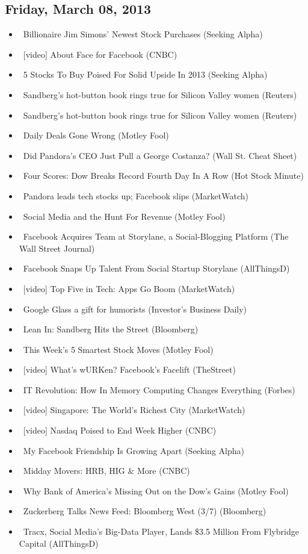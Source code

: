 \documentclass[11pt,asymmetric]{article}
\begin{document}
\subsection*{Friday, March 08, 2013}
\begin{itemize}
\item\ Billionaire Jim Simons' Newest Stock Purchases (Seeking Alpha)
\item\ [video] About Face for Facebook (CNBC)
\item\ 5 Stocks To Buy Poised For Solid Upside In 2013 (Seeking Alpha)
\item\ Sandberg's hot-button book rings true for Silicon Valley women (Reuters)
\item\ Sandberg's hot-button book rings true for Silicon Valley women (Reuters)
\item\ Daily Deals Gone Wrong (Motley Fool)
\item\ Did Pandora’s CEO Just Pull a George Costanza? (Wall St. Cheat Sheet)
\item\ Four Scores: Dow Breaks Record Fourth Day In A Row (Hot Stock Minute)
\item\ Pandora leads tech stocks up; Facebook slips (MarketWatch)
\item\ Social Media and the Hunt For Revenue (Motley Fool)
\item\ Facebook Acquires Team at Storylane, a Social-Blogging Platform (The Wall Street Journal)
\item\ Facebook Snaps Up Talent From Social Startup Storylane (AllThingsD)
\item\ [video] Top Five in Tech: Apps Go Boom (MarketWatch)
\item\ Google Glass a gift for humorists (Investor's Business Daily)
\item\ Lean In: Sandberg Hits the Street (Bloomberg)
\item\ This Week's 5 Smartest Stock Moves (Motley Fool)
\item\ [video] What's wURKen? Facebook's Facelift (TheStreet)
\item\ IT Revolution: How In Memory Computing Changes Everything (Forbes)
\item\ [video] Singapore: The World's Richest City (MarketWatch)
\item\ [video] Nasdaq Poised to End Week Higher (CNBC)
\item\ My Facebook Friendship Is Growing Apart (Seeking Alpha)
\item\ Midday Movers: HRB, HIG \& More (CNBC)
\item\ Why Bank of America's Missing Out on the Dow's Gains (Motley Fool)
\item\ Zuckerberg Talks News Feed: Bloomberg West (3/7) (Bloomberg)
\item\ Tracx, Social Media's Big-Data Player, Lands \$3.5 Million From Flybridge Capital (AllThingsD)
\end{itemize}
\end{document}
